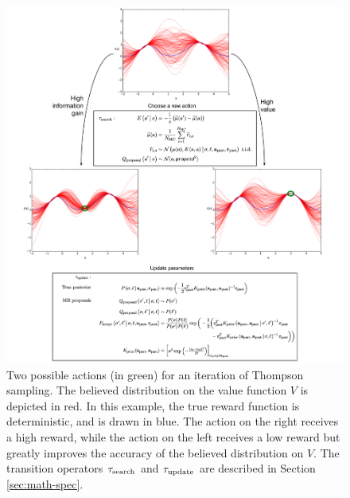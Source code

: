 \begin{figure}
  \centering
  \includegraphics[width=\linewidth]{figs/slide2.pdf}
  \caption{
    Two possible actions (in green) for an iteration of Thompson sampling.  The
    believed distribution on the value function $V$ is depicted in red.  In this
    example, the true reward function is deterministic, and is drawn in blue.
    The action on the right receives a high reward, while the action on the left
    receives a low reward but greatly improves the accuracy of the believed
    distribution on $V$.  The transition operators $\tau_{\textrm{search}}$ and
    $\tau_{\textrm{update}}$ are described in Section \ref{sec:math-spec}.
  }
  \label{fig:slide2}
\end{figure}

